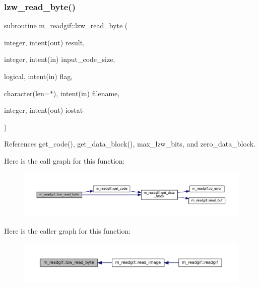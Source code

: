 \subsubsection{\texorpdfstring{lzw\+\_\+read\+\_\+byte()}{lzw\_read\_byte()}}
{\footnotesize\ttfamily subroutine m\+\_\+readgif\+::lzw\+\_\+read\+\_\+byte (\begin{DoxyParamCaption}\item[{integer, intent(out)}]{result,  }\item[{integer, intent(in)}]{input\+\_\+code\+\_\+size,  }\item[{logical, intent(in)}]{flag,  }\item[{character(len=$\ast$), intent(in)}]{filename,  }\item[{integer, intent(out)}]{iostat }\end{DoxyParamCaption})\hspace{0.3cm}{\ttfamily [private]}}



References get\+\_\+code(), get\+\_\+data\+\_\+block(), max\+\_\+lzw\+\_\+bits, and zero\+\_\+data\+\_\+block.

Here is the call graph for this function\+:\nopagebreak
\begin{figure}[H]
\begin{center}
\leavevmode
\includegraphics[width=350pt]{namespacem__readgif_a314e657d0662360266bac5702a657ef1_cgraph}
\end{center}
\end{figure}
Here is the caller graph for this function\+:\nopagebreak
\begin{figure}[H]
\begin{center}
\leavevmode
\includegraphics[width=350pt]{namespacem__readgif_a314e657d0662360266bac5702a657ef1_icgraph}
\end{center}
\end{figure}
\mbox{\label{namespacem__readgif_ae008e851af60f4d8fdeeb4fd96b8580d}} 
